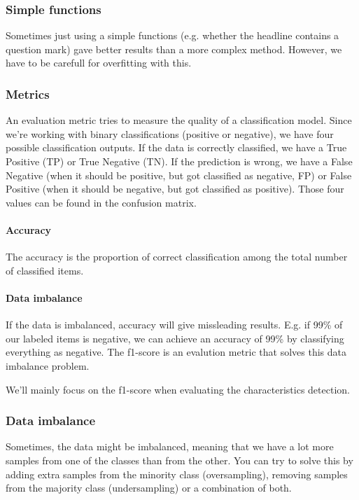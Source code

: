 \documentclass{article}
\begin{document}
\subsubsection{Simple functions}
Sometimes just using a simple functions (e.g. whether the headline contains a question mark) gave better results than a more complex method. However, we have to be carefull for overfitting with this.

\subsubsection{Metrics}
An evaluation metric tries to measure the quality of a classification model. Since we're working with binary classifications (positive or negative), we have four possible classification outputs. If the data is correctly classified, we have a True Positive (TP) or True Negative (TN). If the prediction is wrong, we have a False Negative (when it should be positive, but got classified as negative, FP) or False Positive (when it should be negative, but got classified as positive). Those four values can be found in the confusion matrix. \cite{agarwal_2019}

\paragraph{Accuracy}
The accuracy is the proportion of correct classification among the total number of classified items. \cite{agarwal_2019}

\paragraph{Data imbalance} If the data is imbalanced, accuracy will give missleading results. E.g. if 99\% of our labeled items is negative, we can achieve an accuracy of 99\% by classifying everything as negative. The f1-score is an evalution metric that solves this data imbalance problem.

We'll mainly focus on the f1-score when evaluating the characteristics detection.

\subsubsection{Data imbalance}
Sometimes, the data might be imbalanced, meaning that we have a lot more samples from one of the classes than from the other. You can try to solve this by adding extra samples from the minority class (oversampling), removing samples from the majority class (undersampling) or a combination of both.
\end{document}
